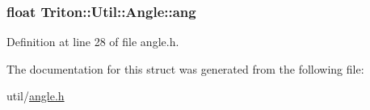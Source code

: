 \subsubsection[{ang}]{\setlength{\rightskip}{0pt plus 5cm}float Triton\+::\+Util\+::\+Angle\+::ang}\label{struct_triton_1_1_util_1_1_angle_af7d7f20a28c150b09776a35bc1dae0c4}


Definition at line 28 of file angle.\+h.



The documentation for this struct was generated from the following file\+:\begin{DoxyCompactItemize}
\item 
util/\hyperlink{angle_8h}{angle.\+h}\end{DoxyCompactItemize}
